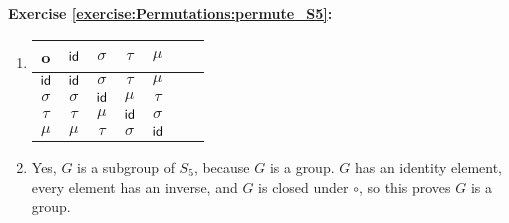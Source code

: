 \noindent\textbf{Exercise \ref{exercise:Permutations:permute_S5}:}
\begin{enumerate}[{a.}]
\item
\begin{tabular}{c| c c c c c c}
		o & $\sf{id}$ & $\sigma$ & $\tau$ & $\mu$\\ \hline
		$\sf{id}$ & $\sf{id}$ & $\sigma$ & $\tau$ & $\mu$\\
		$\sigma$ & $\sigma$ & $\sf{id}$ & $\mu$ & $\tau$\\
		$\tau$ & $\tau$ & $\mu$ & $\sf{id}$ & $\sigma$\\
		$\mu$ & $\mu$ & $\tau$ & $\sigma$ & $\sf{id}$\\
\end{tabular}

\item
Yes, $G$ is a subgroup of $S_5$, because $G$ is a group.  $G$ has an identity element, every element has an inverse, and $G$ is closed under $\circ$, so this proves $G$ is a group.
\end{enumerate}

